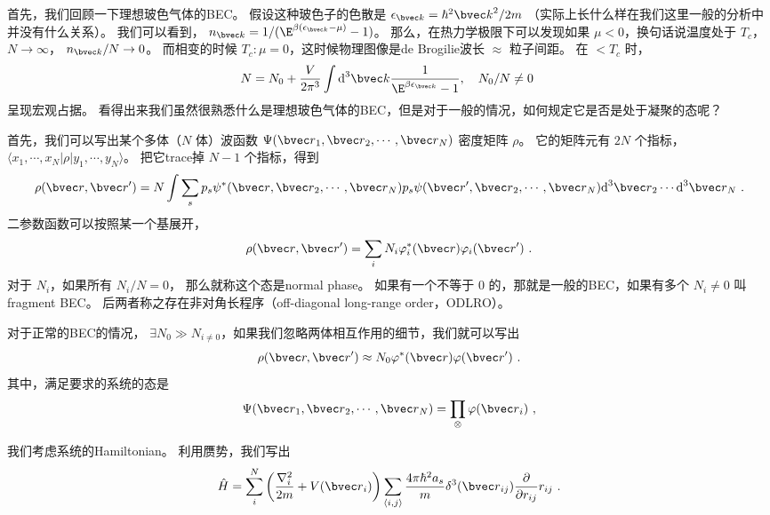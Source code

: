 
首先，我们回顾一下理想玻色气体的BEC。 假设这种玻色子的色散是 $\epsilon_{\bvec k} = \hbar^2{\bvec k}^2/2m$ （实际上长什么样在我们这里一般的分析中并没有什么关系）。 我们可以看到， $n_{\bvec k}=1/(\E^{\beta(\epsilon_{\bvec k}-\mu)}-1)$。 那么，在热力学极限下可以发现如果 $\mu<0$，换句话说温度处于 $T_c$， $N\to\infty$， $n_{\bvec k}/N\to 0$。 而相变的时候 $T_c: \mu=0$，这时候物理图像是de Brogilie波长 $\approx$ 粒子间距。 在 $<T_c$ 时，
\begin{equation}
N=N_0+\frac{V}{2\pi^3}\int \text{d}^3{\bvec k}\frac{1}{\E^{\beta\epsilon_{\bvec k}}-1},\quad N_0/N\neq0~
\end{equation}
呈现宏观占据。 看得出来我们虽然很熟悉什么是理想玻色气体的BEC，但是对于一般的情况，如何规定它是否是处于凝聚的态呢？

首先，我们可以写出某个多体（$N$ 体）波函数 $\Psi({\bvec r}_1,{\bvec r}_2,\cdots,{\bvec r}_N)$ 密度矩阵 $\rho$。 它的矩阵元有 $2N$ 个指标， $\langle x_1,\cdots,x_N|\rho|y_1,\cdots,y_N\rangle$。 把它trace掉 $N-1$ 个指标，得到
\begin{equation}
\rho({\bvec r},{\bvec r'}) = N\int\sum_s p_s\psi^*({\bvec r},{\bvec r}_2,\cdots,{\bvec r}_N)p_s\psi({\bvec r'},{\bvec r}_2,\cdots,{\bvec r}_N)\text{d}^3{\bvec r}_2\cdots\text{d}^3{\bvec r}_N~.
\end{equation}
二参数函数可以按照某一个基展开，
\begin{equation}
\rho({\bvec r},{\bvec r'}) = \sum_i N_i \varphi_i^*({\bvec r})\varphi_i({\bvec r'})~.
\end{equation}
对于 $N_i$，如果所有 $N_i/N=0$， 那么就称这个态是normal phase。 如果有一个不等于 $0$ 的，那就是一般的BEC，如果有多个 $N_i\neq0$ 叫 fragment BEC。 后两者称之存在非对角长程序（off-diagonal long-range order，ODLRO）。

对于正常的BEC的情况， $\exists N_0\gg N_{i\neq0}$，如果我们忽略两体相互作用的细节，我们就可以写出
\begin{equation}
\rho({\bvec r,\bvec r'}) \approx N_0\varphi^*({\bvec r})\varphi({\bvec r'})~.
\end{equation}
其中，满足要求的系统的态是
\begin{equation}\label{eq_BECSup_5}
\Psi({\bvec r}_1,{\bvec r}_2,\cdots,{\bvec r}_N) = \prod_{\otimes}\varphi({\bvec r}_i)~,
\end{equation}

我们考虑系统的Hamiltonian。 利用赝势，我们写出
\begin{equation}
\hat{H} = \sum_i^N \left(\frac{\nabla_i^2}{2m}+V({\bvec r}_i)\right)\sum_{\langle i,j\rangle}\frac{4\pi\hbar^2 a_s}{m}\delta^3({\bvec r}_{ij})\frac{\partial}{\partial r_{ij}}r_{ij}~.
\end{equation}

